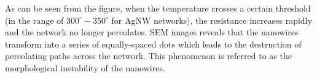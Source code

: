     As can be seen from the figure, when the temperature crosses a certain threshold (in the range of  $300^\circ - 350^\circ$ for AgNW networks), the resistance increases rapidly and the network no longer percolates. SEM images reveals that the nanowires transform into a series of equally-spaced dots which leads to the destruction of percolating paths across the network. This phenomenon is referred to as the morphological instability of the nanowires.

